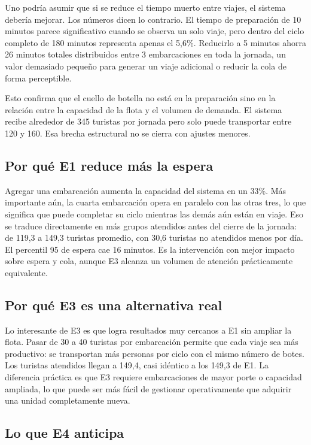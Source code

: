 \documentclass[12pt,a4paper]{article}
\begin{document}
Uno podría asumir que si se reduce el tiempo muerto entre viajes, el
sistema debería mejorar. Los números dicen lo contrario. El tiempo de
preparación de 10 minutos parece significativo cuando se observa un
solo viaje, pero dentro del ciclo completo de 180 minutos representa
apenas el 5,6\%. Reducirlo a 5 minutos ahorra 26 minutos totales
distribuidos entre 3 embarcaciones en toda la jornada, un valor
demasiado pequeño para generar un viaje adicional o reducir la cola
de forma perceptible.

Esto confirma que el cuello de botella no está en la preparación sino
en la relación entre la capacidad de la flota y el volumen de demanda.
El sistema recibe alrededor de 345 turistas por jornada pero solo puede
transportar entre 120 y 160. Esa brecha estructural no se cierra con
ajustes menores.

\subsection{Por qué E1 reduce más la espera}

Agregar una embarcación aumenta la capacidad del sistema en un 33\%.
Más importante aún, la cuarta embarcación opera en paralelo con las
otras tres, lo que significa que puede completar su ciclo mientras las
demás aún están en viaje. Eso se traduce directamente en más grupos
atendidos antes del cierre de la jornada: de 119,3 a 149,3 turistas
promedio, con 30,6 turistas no atendidos menos por día. El percentil 95
de espera cae 16 minutos. Es la intervención con mejor impacto sobre
espera y cola, aunque E3 alcanza un volumen de atención prácticamente
equivalente.

\subsection{Por qué E3 es una alternativa real}

Lo interesante de E3 es que logra resultados muy cercanos a E1 sin
ampliar la flota. Pasar de 30 a 40 turistas por embarcación permite
que cada viaje sea más productivo: se transportan más personas por
ciclo con el mismo número de botes. Los turistas atendidos llegan a
149,4, casi idéntico a los 149,3 de E1. La diferencia práctica es que
E3 requiere embarcaciones de mayor porte o capacidad ampliada, lo que
puede ser más fácil de gestionar operativamente que adquirir una
unidad completamente nueva.

\subsection{Lo que E4 anticipa}
\end{document}
